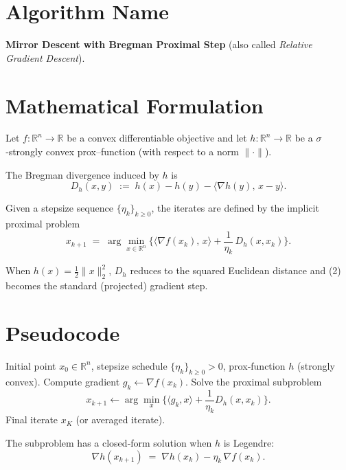 \documentclass{article}
\begin{document}
\section*{Algorithm Name}
\textbf{Mirror Descent with Bregman Proximal Step} (also called
\emph{Relative Gradient Descent}).  

\section*{Mathematical Formulation}
Let $f:\mathbb{R}^{n}\rightarrow\mathbb{R}$ be a convex differentiable
objective and let $h:\mathbb{R}^{n}\rightarrow\mathbb{R}$ be a
$\sigma$‑strongly convex prox–function (with respect to a norm
$\|\cdot\|$).  

The Bregman divergence induced by $h$ is
\[
D_{h}(x,y)\;:=\;h(x)-h(y)-\langle\nabla h(y),\,x-y\rangle .
\tag{1}
\]

Given a stepsize sequence $\{\eta_k\}_{k\ge 0}$, the iterates are defined
by the implicit proximal problem
\[
\boxed{
x_{k+1}
\;=\;
\arg\min_{x\in\mathbb{R}^{n}}
\Big\{
\langle \nabla f(x_k),\,x\rangle
+\frac{1}{\eta_k}\,D_{h}(x,x_k)
\Big\}.
}
\tag{2}
\]

When $h(x)=\tfrac12\|x\|_2^{2}$, $D_h$ reduces to the squared Euclidean
distance and (2) becomes the standard (projected) gradient step.

\section*{Pseudocode}
\begin{algorithm}[H]
\caption{Mirror Descent (Bregman Proximal Step)}
\begin{algorithmic}[1]
\REQUIRE Initial point $x_0\in\mathbb{R}^{n}$, stepsize schedule
$\{\eta_k\}_{k\ge0}>0$, prox‑function $h$ (strongly convex).
    \STATE Compute gradient $g_k\gets\nabla f(x_k)$.
    \STATE Solve the proximal subproblem
    \[
    x_{k+1}\gets\arg\min_x\Big\{\langle g_k,x\rangle
    +\frac{1}{\eta_k}D_h(x,x_k)\Big\}.
    \]
\ENDFOR
\ENSURE Final iterate $x_K$ (or averaged iterate).
\end{algorithmic}
\end{algorithm}

The subproblem has a closed‑form solution when $h$ is Legendre:
\[
\nabla h(x_{k+1})\;=\;\nabla h(x_k)-\eta_k\,\nabla f(x_k).
\tag{3}
\]
\end{document}
